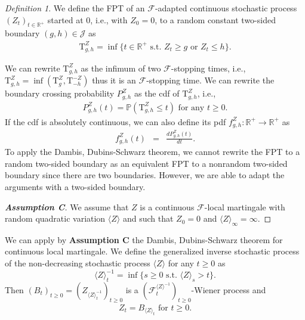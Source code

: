 \documentclass[aop]{imsart}
\theoremstyle{plain}
\theoremstyle{remark}
\newtheorem{definition}[theorem]{Definition}
\newcommand{\reels}{\mathbb{R}}
\newcommand{\proba}{\mathbb{P}}
\newcommand{\Tau}{\mathrm{T}}
\begin{document}
\begin{definition}\label{defFPT_rc2}
We define the FPT of an $\mathcal{F}$-adapted continuous stochastic process $(Z_t)_{t \in \reels^+}$ started at 0, i.e., with $Z_0=0$, to a random constant two-sided boundary
$(g,h) \in \mathcal{J}$ as
\begin{eqnarray}
\label{TgZdef_rc2}
\Tau_{g,h}^Z = \inf \{t \in \reels^+ \text{ s.t. } Z_t \geq g \text{ or } Z_t \leq h \}.
\end{eqnarray}
\end{definition}
\noindent We can rewrite $\Tau_{g,h}^Z$ as the infimum of two $\mathcal{F}$-stopping times, i.e., $\Tau_{g,h}^Z = \inf (\Tau_{g}^Z,\Tau_{-h}^{-Z})$ thus it is an $\mathcal{F}$-stopping time. We can rewrite the boundary crossing probability $P_{g,h}^Z$ as the cdf of $\Tau_{g,h}^Z$, i.e., 
\begin{eqnarray}
\label{PgZdef_rc2}
P_{g,h}^Z(t)= \proba (\Tau^Z_{g,h} \leq t) \text{ for any } t \geq 0.
\end{eqnarray}
If the cdf is absolutely continuous, we can also define its pdf $f_{g,h}^Z: \reels^+  \rightarrow  \reels^+$ as
\begin{eqnarray}
\label{fZgt_rc2}
f_{g,h}^Z(t) & = & \frac{dP_{g,h}^Z(t)}{dt}.
\end{eqnarray}
\noindent To apply the Dambis, Dubins-Schwarz theorem, we cannot rewrite the FPT to a random two-sided boundary as an equivalent FPT to a nonrandom two-sided boundary since there are two boundaries. However, we are able to adapt the arguments with a two-sided boundary. 
\begin{proof}[\textbf{Assumption C}]
We assume that $Z$ is a continuous $\mathcal{F}$-local martingale with random quadratic variation $\langle Z\rangle$ and such that $Z_0=0$ and $\langle Z\rangle_{\infty} = \infty$.
\phantom\qedhere
\end{proof} 
\noindent We can apply by \textbf{Assumption C} the Dambis, Dubins-Schwarz theorem for continuous local martingale. We define the generalized inverse stochastic process of the non-decreasing stochastic process $\langle Z\rangle$ for any $t \geq0$ as 
$$\langle Z\rangle_{t}^{-1}=\inf\{s \geq 0 \text{ s.t. }\langle Z\rangle_{s}>t\}.$$ 
Then $(B_{t})_{t\geq 0}=(Z_{\langle Z\rangle_{t}^{-1}})_{t\geq 0}$ is a $({\mathcal {F}}_t^{\langle Z\rangle^{-1}})_{t\geq 0}$-Wiener process and 
\begin{eqnarray}
\label{proof230110_rc2}
Z_{t}=B_{\langle Z\rangle_{t}} \text{ for } t \geq 0.
\end{eqnarray}
\end{document}
